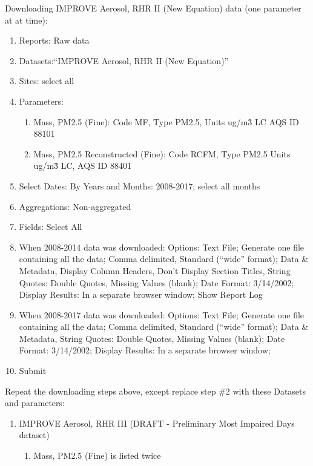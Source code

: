 \noindent Downloading IMPROVE Aerosol, RHR II (New Equation) data (one parameter at at time):
\begin{enumerate}
\item Reports: Raw data
\item Datasets:``IMPROVE Aerosol, RHR II (New Equation)''
\item Sites: select all
\item Parameters: 
  \begin{enumerate}
  \item Mass, PM2.5 (Fine): Code MF, Type PM2.5, Units ug/m\^3 LC AQS ID 88101
  \item Mass, PM2.5 Reconstructed (Fine): Code RCFM, Type PM2.5 Units ug/m\^3 LC, AQS ID 88401
  \end{enumerate}
\item Select Dates: By Years and Months: 2008-2017; select all months
\item Aggregations: Non-aggregated
\item Fields: Select All
\item When 2008-2014 data was downloaded: Options: Text File; Generate one file containing all the data; Comma delimited, Standard (``wide'' format); Data \& Metadata, Display Column Headers, Don't Display Section Titles, String Quotes: Double Quotes, Missing Values (blank); Date Format: 3/14/2002; Display Results: In a separate browser window; Show Report Log
\item When 2008-2017 data was downloaded: Options: Text File; Generate one file containing all the data; Comma delimited, Standard (``wide'' format); Data \& Metadata, %
String Quotes: Double Quotes, Missing Values (blank); Date Format: 3/14/2002; Display Results: In a separate browser window; %

\item Submit
\end{enumerate}

Repeat the downloading steps above, except replace step \#2 with these Datasets and parameters:
\begin{enumerate}
\item IMPROVE Aerosol, RHR III (DRAFT - Preliminary Most Impaired Days dataset) 
	\begin{enumerate}
	\item Mass, PM2.5 (Fine) is listed twice %
	\end{enumerate}
\end{enumerate}


